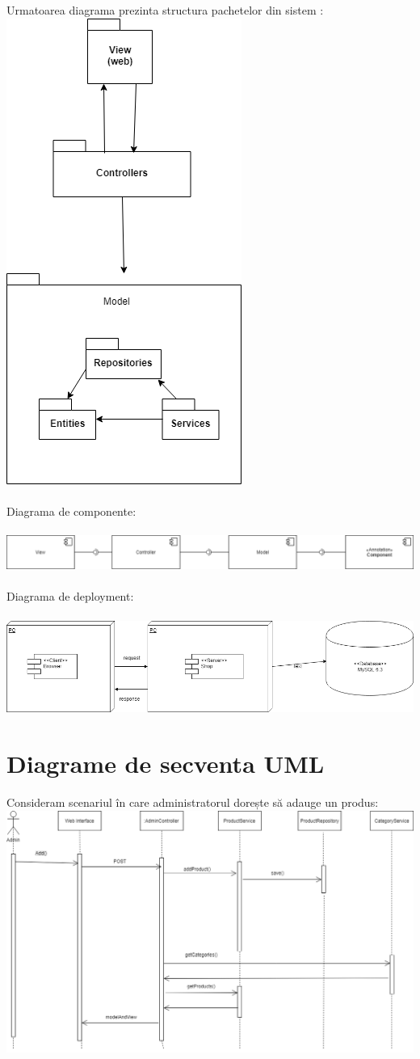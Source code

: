 \documentclass[11pt,a4paper,twoside,notitlepage]{article}
\begin{document}
Urmatoarea diagrama prezinta structura pachetelor din sistem :
\newpage
\includegraphics[height=.4\textheight, width=.4\textwidth]{packages} \\
\\
Diagrama de componente: \\
\\
\includegraphics[width=.6\textheight]{components} \\
\\
Diagrama de deployment: \\
\\
\includegraphics[width=.6\textheight]{deployment} \\


\section{Diagrame de secventa UML}
Consideram scenariul în care administratorul dorește să adauge un produs: \\
\includegraphics[width=.6\textheight]{secventa}
\end{document}
